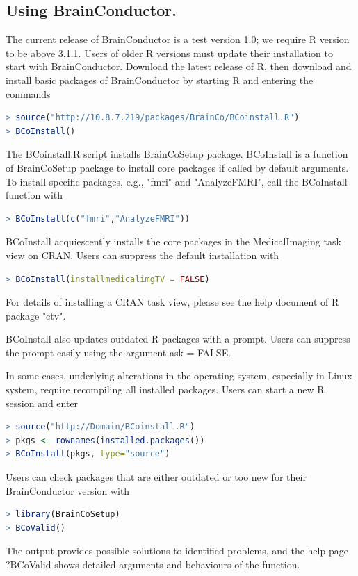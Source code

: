\documentclass{nature}
\begin{document}
\begin{methods}
\section{Using BrainConductor.}
The current release of BrainConductor is a test version
1.0; we require R version to be above 3.1.1. Users of older R versions must
update their installation to start with BrainConductor. Download the latest
release of R, then download and install basic packages of BrainConductor by
starting R and entering the commands
\begin{lstlisting}[language = R]
> source("http://10.8.7.219/packages/BrainCo/BCoinstall.R")
> BCoInstall()
\end{lstlisting}
The BCoinstall.R script installs BrainCoSetup package. BCoInstall is a function
of BrainCoSetup package to install core packages if called by default arguments.
To install specific packages, e.g., "fmri" and "AnalyzeFMRI", call the
BCoInstall function with
\begin{lstlisting}[language = R]
> BCoInstall(c("fmri","AnalyzeFMRI"))
\end{lstlisting}
BCoInstall acquiescently installs the core packages in the MedicalImaging task
view on CRAN. Users can suppress the default installation with
\begin{lstlisting}[language = R]
> BCoInstall(installmedicalimgTV = FALSE)
\end{lstlisting}
For details of installing a CRAN task view, please see the help document of R
package "ctv".

BCoInstall also updates outdated R packages with a prompt. Users can suppress
the prompt easily using the argument ask = FALSE.

In some cases, underlying alterations in the operating system, especially in
Linux system, require recompiling all installed packages. Users can start a new
R session and enter
\begin{lstlisting}[language = R]
> source("http://Domain/BCoinstall.R")
> pkgs <- rownames(installed.packages())
> BCoInstall(pkgs, type="source")
\end{lstlisting}

Users can check packages that are either outdated or too new for their
BrainConductor version with
\begin{lstlisting}[language = R]
> library(BrainCoSetup)
> BCoValid()
\end{lstlisting}
The output provides possible solutions to identified problems, and the help page
?BCoValid shows detailed arguments and behaviours of the function.





\end{methods}
\end{document}
